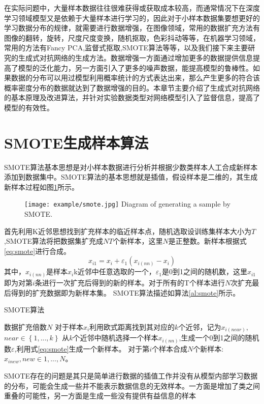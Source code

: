 在实际问题中，大量样本数据往往很难获得或获取成本较高，而通常情况下在深度学习领域模型又是依赖于大量样本进行学习的，因此对于小样本数据集要想更好的学习数据分布的规律，就需要进行数据增强，在图像领域，常用的数据扩充方法有图像的翻转，旋转，尺度尺度变换，随机抠取，色彩抖动等等，在机器学习领域，常用的方法有Fancy PCA\cite{Holdt2010Genome},监督式抠取,SMOTE算法等等，以及我们接下来主要研究的生成式对抗网络的生成方法。数据增强一方面通过增加更多的数据提供信息提高了模型的泛化能力，另一方面引入了更多的噪声数据，能提高模型的鲁棒性。如果数据的分布可以用过模型利用概率统计的方式表达出来，那么产生更多的符合该概率密度分布的数据就达到了数据增强的目的。本章节主要介绍了生成式对抗网络的基本原理及改进算法，并针对实验数据类型对网络模型引入了监督信息，提高了模型的有效性。
\section{SMOTE生成样本算法}
SMOTE算法基本思想是对小样本数据进行分析并根据少数类样本人工合成新样本添加到数据集中。SMOTE算法的基本思想就是插值，假设样本是二维的，其生成新样本过程如图\ref{fig:smote}所示。
\begin{figure}[htbp]
	\centering
	\texttt{[image: example/smote.jpg]}
	{Diagram of generating a sample by SMOTE.}
	\label{fig:smote}
\end{figure}

首先利用K近邻思想找到扩充样本的临近样本点，随机选取设训练集样本大小为$T$,SMOTE算法将把数据集扩充成$NT$个新样本，这里$N$是正整数。新样本根据式\ref{eq:smote}进行合成。
\begin{equation}
	\label{eq:smote}
	{x_{i1}} = {x_i} + {\varepsilon _1}({x_{i(nn)}} - {x_i})
\end{equation}
其中，${x_{i(nn)}}$是样本$x_i$k近邻中任意选取的一个，$\varepsilon _1$是0到1之间的随机数，这里$x_{i1}$即为对第$i$条进行一次扩充后得到的新的样本。对于所有的T个样本进行$N$次扩充最后得到的扩充数据即为新样本集。
SMOTE算法描述如算法\ref{al:smote}所示。

\begin{algorithm}[htbp]
	\caption{SMOTE算法}%
	\label{al:smote}
	\begin{algorithmic}[1]%
		\Require
		数据扩充倍数$N$
		\State 对于样本$x_i$利用欧式距离找到其对应的$k$个近邻，记为${x_{i(near)}}$,$near\in\left\{ {1,...,k} \right\} $
		\State
		从$k$个近邻中随机选择一个样本${x_{i(nn)}}$,生成一个0到1之间的随机数$\varepsilon$,利用式\ref{eq:smote}生成一个新样本。
		\EndFor
		\State 对于第$i$个样本合成$N$个新样本:${x_{inew}},new \in 1,...,N$。
		\EndFor
	\end{algorithmic}
\end{algorithm}
SMOTE存在的问题是其只是简单进行数据的插值工作并没有从模型内部学习数据的分布，可能会生成一些并不能表示数据信息的无效样本。一方面是增加了类之间重叠的可能性，另一方面是生成一些没有提供有益信息的样本

